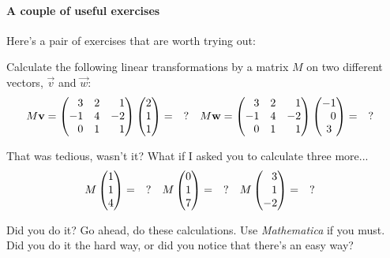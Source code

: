 \documentclass[12pt]{article}
\begin{document}
\paragraph{A couple of useful exercises}
Here's a pair of exercises that are worth trying out:
\begin{exercise}
Calculate the following linear transformations by a matrix $M$ on two different vectors, $\vec{v}$ and $\vec{w}$:
\begin{align}
    M\vec{v} &= 
    \begin{pmatrix}
        \pp 3 & 2 & \pp 1 \\
        - 1 & 4 & -2 \\
        \pp 0 & 1 & \pp 1
    \end{pmatrix}
    \begin{pmatrix}
        2 \\ 1 \\ 1
    \end{pmatrix}
    = \quad ?
    &
    M\vec{w} &= 
    \begin{pmatrix}
        \pp 3 & 2 & \pp 1 \\
        - 1 & 4 & -2 \\
        \pp 0 & 1 & \pp 1
    \end{pmatrix}
    \begin{pmatrix}
        -1 \\ \pp 0 \\ 3
    \end{pmatrix}
    = \quad ?
\end{align}
\end{exercise}
\begin{exercise}
That was tedious, wasn't it? What if I asked you to calculate three more...
\begin{align}
    M
    \begin{pmatrix}
        1 \\ 1 \\ 4
    \end{pmatrix}
    &= \quad ?
    &
    M
    \begin{pmatrix}
        0 \\ 1 \\ 7
    \end{pmatrix}
    &= \quad ?
    &
    M
    \begin{pmatrix}
        \pp 3 \\ \pp 1 \\ -2
    \end{pmatrix}
    &= \quad ?
    \label{eq:eg:more:multiplications}
\end{align}
\end{exercise}
Did you do it? Go ahead, do these calculations. Use \emph{Mathematica} if you must. Did you do it the hard way, or did you notice that there's an easy way? 
\end{document}
